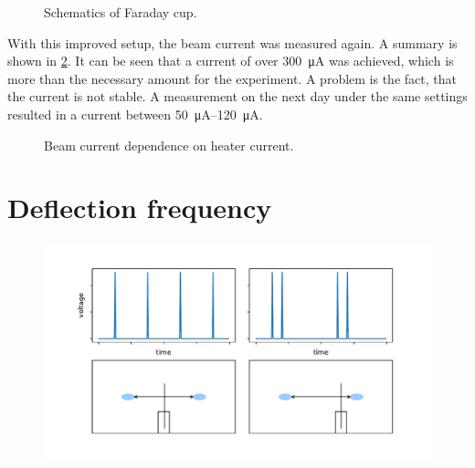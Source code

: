 \begin{figure}[h]
	\centering
	\begin{tikzpicture}
		
	\end{tikzpicture}
	
	\caption{Schematics of Faraday cup.}
	\label{fig:Schematics of Faraday cup}
\end{figure}

With this improved setup, the beam current was measured again. A summary is shown in \cref{fig:Beam current dependence on heater current}. It can be seen that a current of over \SI{300}{\micro\ampere} was achieved, which is more than the necessary amount for the experiment. A problem is the fact, that the current is not stable. A measurement on the next day under the same settings resulted in a current between \SIrange{50}{120}{\micro\ampere}.

\begin{figure}[h]
	\centering
	\begin{tikzpicture}
		
	\end{tikzpicture}

	\caption{Beam current dependence on heater current.}
	\label{fig:Beam current dependence on heater current}
\end{figure}

\section{Deflection frequency}

\begin{figure}
	\centering
	\includegraphics[width=0.8\linewidth]{Chapters/beam-characterization/Spikes}
	\caption{}
	\label{fig:spikes}
\end{figure}

